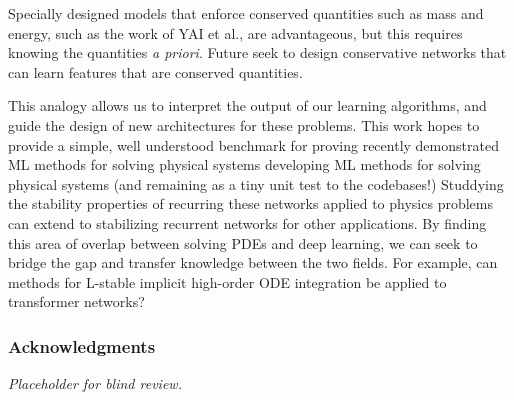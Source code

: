 \documentclass{article}
\begin{document}
Specially designed models that enforce conserved quantities such as
mass and energy, such as the work of YAI et al., are
advantageous, but this requires knowing the quantities {\em a
  priori}. Future seek to design conservative networks that can learn features
that are conserved quantities.


This analogy allows us to interpret the output of our learning algorithms, and guide the design of new architectures for these problems.
This work hopes to provide a simple, well understood benchmark for
proving recently demonstrated ML methods for solving physical systems
developing ML methods for solving physical systems (and remaining as a
tiny unit test to the codebases!)
Studdying the stability properties of recurring these networks applied
to physics problems can extend to stabilizing recurrent networks for
other applications.
By finding this area of overlap between solving PDEs and deep learning, we can seek to bridge the gap and transfer knowledge between the two fields. For example, can methods for L-stable implicit high-order ODE integration be applied to transformer networks?




\subsubsection*{Acknowledgments}

{\em Placeholder for blind review.}






\end{document}
